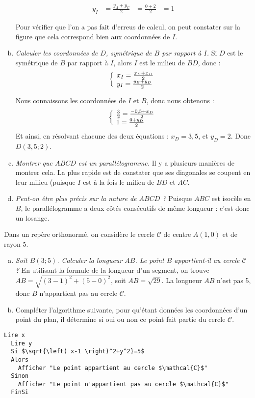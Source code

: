 \documentclass[12pt]{article}
\begin{document}
\begin{exercice}
\begin{enumerate}[(a)]
\begin{multicols}{2}
    \begin{align*}
      y_I&=\frac{y_A+y_C}{2}
         &=\frac{0+2}{2}
         &=1
    \end{align*}
  \end{multicols}
  Pour vérifier que l'on a pas fait d'erreus de calcul, on peut constater sur la figure que cela correspond bien aux coordonnées de $I$.
  \item \emph{Calculer les coordonnées de $D$, symétrique de $B$ par rapport à $I$.}
    Si $D$ est le symétrique de $B$ par rapport à $I$, alors $I$ est le milieu de $BD$, donc :
    \[\left\{\begin{array}{l}
      x_I=\frac{x_B+x_D}{2}
    \\
      y_I=\frac{y_B+y_D}{2}
    \end{array}\right.\]

    Nous connaissons les coordonnées de $I$ et $B$, donc nous obtenons :
    \[\left\{\begin{array}{l}
      \frac{3}{2}=\frac{-0,5+x_D}{2}
    \\
      1=\frac{0+y_D}{2}
    \end{array}\right.\]
    Et ainsi, en résolvant chacune des deux équations : $x_D=3,5$, et $y_D=2$. Donc $D(3,5;2)$.
  \item \emph{Montrer que $ABCD$ est un parallélogramme.}
    Il y a plusieurs manières de montrer cela. La plus rapide est de constater que ses diagonales se coupent en leur milieu (puisque $I$ est à la fois le milieu de $BD$ et $AC$.
  \item \emph{Peut-on être plus précis sur la nature de $ABCD$ ?}
    Puisque $ABC$ est isocèle en $B$, le parallélogramme a deux côtés consécutifs de même longueur : c'est donc un losange.
\end{enumerate}
\end{exercice}

\begin{exercice}
  Dans un repère orthonormé, on considère le cercle $\mathcal{C}$ de centre $A(1, 0)$ et de rayon 5.
  \begin{enumerate}[(a)]
    \item \emph{Soit $B(3;5)$. Calculer la longueur $AB$. Le point $B$ appartient-il au cercle $\mathcal{C}$ ?} En utilisant la formule de la longueur d'un segment, on trouve $AB=\sqrt{\left( 3-1 \right)^2+\left( 5-0 \right)^2}$, soit $AB=\sqrt{29}$. La longueur $AB$ n'est pas 5, donc $B$ n'appartient pas au cercle $\mathcal{C}$.
    \item Compléter l'algorithme suivante, pour qu'étant données les coordonnées d'un point du plan, il détermine si oui ou non ce point fait partie du cercle $\mathcal{C}$.
  \end{enumerate}

  \begin{lstlisting}[language=naturel,frame=lines,mathescape=true]
  Lire x
  Lire y
  Si $\sqrt{\left( x-1 \right)^2+y^2}=5$
  Alors
    Afficher "Le point appartient au cercle $\mathcal{C}$"
  Sinon
    Afficher "Le point n'appartient pas au cercle $\mathcal{C}$"
  FinSi
  \end{lstlisting}

\end{exercice}
\end{document}
